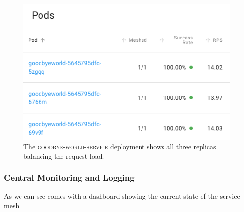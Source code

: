 \begin{figure}
	\includegraphics[width=\columnwidth]{img/results-load-balance}
	\caption{The \textsc{goodbye-world-service} deployment shows all three replicas balancing the request-load.}
	\label{fig:results-load-balance}
\end{figure}

\subsubsection{Central Monitoring and Logging}
As we can see \linkerd{} comes with a dashboard showing the current state of the service mesh.

